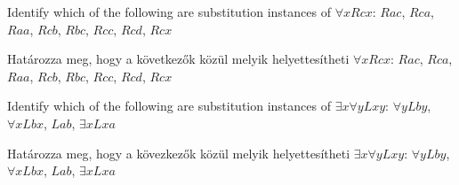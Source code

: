 \solutions
\problempart
\label{pr.subinstanceQL}
\begin{earg}
\item Identify which of the following are substitution instances of $\forall x Rcx$: $Rac$, $Rca$, $Raa$, $Rcb$, $Rbc$, $Rcc$, $Rcd$, $Rcx$
\item Határozza meg, hogy a következők közül melyik helyettesítheti $\forall x Rcx$: $Rac$, $Rca$, $Raa$, $Rcb$, $Rbc$, $Rcc$, $Rcd$, $Rcx$
\item Identify which of the following are substitution instances of $\exists x\forall y Lxy$:
$\forall y Lby$, $\forall x Lbx$, $Lab$, $\exists x Lxa$
\item Határozza meg, hogy a kövezkezők közül melyik helyettesítheti $\exists x\forall y Lxy$:
$\forall y Lby$, $\forall x Lbx$, $Lab$, $\exists x Lxa$
\end{earg}



